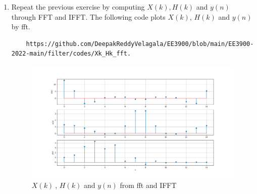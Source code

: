\documentclass[journal,12pt,twocolumn]{IEEEtran}
\renewcommand\thesection{\arabic{section}}
\begin{document}
\begin{enumerate}[label=\thesection.\arabic*]
\item Repeat the previous exercise by computing $X(k), H(k)$ and $y(n)$ through FFT and 
IFFT.
\solution The following code plots $X(k)$, $H(k)$ and $y(n)$ by fft.
\begin{lstlisting}
    https://github.com/DeepakReddyVelagala/EE3900/blob/main/EE3900-2022-main/filter/codes/Xk_Hk_fft.
\end{lstlisting}
\begin{figure}[!ht]
\centering
\includegraphics[width=\columnwidth]{figs/Xk-Hk-Yn_fft.png}
\caption{$X(k)~$, $H(k)$ and $y(n)$ from fft and IFFT}
\label{fig:Xk_Hk_yn}
\end{figure}

\end{enumerate}
%

\end{document}

